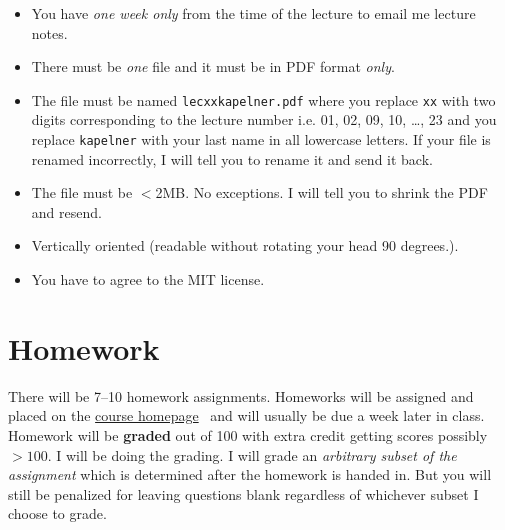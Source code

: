 \documentclass[12pt]{article}
\newcommand{\coursewebpage}{\href{https://github.com/kapelner/QC_Math_369_Fall_2020}{course homepage}}
\begin{document}
\begin{itemize}
\item You have \emph{one week only} from the time of the lecture to email me lecture notes.
\item There must be \emph{one} file and it must be in PDF format \textit{only}.
\item The file must be named \texttt{lecxxkapelner.pdf} where you replace \texttt{xx} with two digits corresponding to the lecture number i.e. 01, 02, 09, 10, \ldots, 23 and you replace \texttt{kapelner} with your last name in all lowercase letters. If your file is renamed incorrectly, I will tell you to rename it and send it back.
\item The file must be $<$2MB. No exceptions. I will tell you to shrink the PDF and resend.
\item Vertically oriented (readable without rotating your head 90 degrees.).
\item You have to agree to the MIT license.
\end{itemize}

\section*{Homework}

There will be 7--10 homework assignments. Homeworks will be assigned and placed on the \coursewebpage~ and will usually be due a week later in class. Homework will be \textbf{graded} out of 100 with extra credit getting scores possibly $> 100$. I will be doing the grading. I will grade an \textit{arbitrary subset of the assignment} which is determined after the homework is handed in. But you will still be penalized for leaving questions blank regardless of whichever subset I choose to grade. 

%
\end{document}
